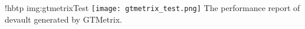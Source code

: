 \namedfigure
{!hbtp}
{img:gtmetrixTest}
{\texttt{[image: gtmetrix\_test.png]}}
{The performance report of devault generated by GTMetrix.}
